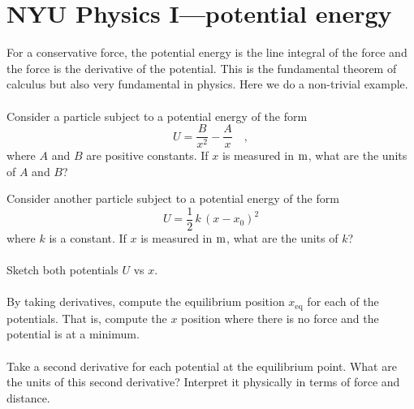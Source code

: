 \documentclass[12pt]{article}
\begin{document}
\section*{NYU Physics I---potential energy}

For a conservative force, the potential energy is the line integral of
the force and the force is the derivative of the potential.  This is
the fundamental theorem of calculus but also very fundamental in
physics.  Here we do a non-trivial example.

\paragraph{\theproblem}%
Consider a particle subject to a potential energy of the form
\begin{equation}
U = \frac{B}{x^2} - \frac{A}{x} \quad ,
\label{eq:hard}
\end{equation}
where $A$ and $B$ are positive constants.  If $x$ is measured in $\mathrm{m}$,
what are the units of $A$ and $B$?

Consider another particle subject to a potential energy of the form
\begin{equation}
U = \frac{1}{2}\,k\,(x-x_0)^2
\label{eq:easy}
\end{equation}
where $k$ is a constant.  If $x$ is measured in $\mathrm{m}$, what are
the units of $k$?

\paragraph{\theproblem}%
Sketch both potentials $U$ vs $x$.

\paragraph{\theproblem}%
By taking derivatives, compute the equilibrium position
$x_\mathrm{eq}$ for each of the potentials.  That is, compute the $x$
position where there is no force and the potential is at a minimum.

\paragraph{\theproblem}%
Take a second derivative for each potential at the equilibrium point.
What are the units of this second derivative?  Interpret it physically
in terms of force and distance.
\end{document}
